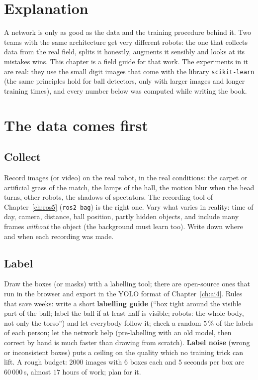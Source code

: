\label{ch:ai5}

\section*{Explanation}
A network is only as good as the data and the training procedure behind it. Two teams with the same architecture get very different robots: the one that collects data from the real field, splits it honestly, augments it sensibly and looks at its mistakes wins. This chapter is a field guide for that work. The experiments in it are real: they use the small digit images that come with the library \texttt{scikit-learn} (the same principles hold for ball detectors, only with larger images and longer training times), and every number below was computed while writing the book.

\section*{The data comes first}
\subsection*{Collect}
Record images (or video) on the real robot, in the real conditions: the carpet or artificial grass of the match, the lamps of the hall, the motion blur when the head turns, other robots, the shadows of spectators. The recording tool of Chapter~\ref{ch:ros5} (\texttt{ros2 bag}) is the right one. Vary what varies in reality: time of day, camera, distance, ball position, partly hidden objects, and include many frames \emph{without} the object (the background must learn too). Write down where and when each recording was made.
\subsection*{Label}
Draw the boxes (or masks) with a labelling tool; there are open-source ones that run in the browser and export in the YOLO format of Chapter~\ref{ch:ai4}. Rules that save weeks: write a short \textbf{labelling guide} (``box tight around the visible part of the ball; label the ball if at least half is visible; robots: the whole body, not only the torso'') and let everybody follow it; check a random $5\,\%$ of the labels of each person; let the network help (pre-labelling with an old model, then correct by hand is much faster than drawing from scratch). \textbf{Label noise} (wrong or inconsistent boxes) puts a ceiling on the quality which no training trick can lift. A rough budget: $2000$ images with $6$ boxes each and $5$ seconds per box are $60\,000$\,s, almost $17$ hours of work; plan for it.
